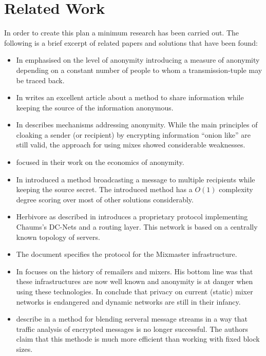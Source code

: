 \documentclass[twocolumn,a4paper,10pt,english]{scrartcl}
\begin{document}
\section{Related Work}
In order to create this plan a minimum research has been carried out. The following is a brief excerpt of related papers and solutions that have been found:
\begin{itemize}
\item In \cite{k-anonymous:ccs2003} \citeauthor{k-anonymous:ccs2003} emphasised on the level of anonymity introducing a measure of anonymity depending on a constant number of people to whom a transmission-tuple may be traced back.
\item In \citeyear{chaum-dc} \citeauthor{chaum-dc} writes an excellent article\cite{chaum-dc} about a method to share information while keeping the source of the information anonymous.
\item In \cite{CHAUM1} \citeauthor{CHAUM1} describes mechanisms addressing anonymity. While the main principles of cloaking a sender (or recipient) by encrypting information ``onion like'' are still valid, the approach for using mixes showed considerable weaknesses.
\item \citeauthor{danezis:weis2006} focused in their work \cite{danezis:weis2006} on the economics of anonymity.
\item In \cite{xor-trees} \citeauthor{xor-trees} introduced a method broadcasting a message to multiple recipients while keeping the source secret. The introduced method has a $O(1)$ complexity degree scoring over most of other solutions considerably.
\item Herbivore as described in \cite{herbivore:tr} introduces a proprietary protocol implementing Chaums's DC-Nets and a routing layer. This network is based on a centrally known topology of servers.
\item The document \cite{mixmaster-spec} specifies the protocol for the Mixmaster infrastructure.
\item In \cite{remailer-history} \citeauthor{remailer-history} focuses on the history of remailers and mixers. His bottom line was that these infrastructures are now well known and anonymity is at danger when using these technologies. In \cite{RP03-1} \citeauthor{RP03-1} conclude that privacy on current (static) mixer networks is endangered and dynamic networks are still in their infancy.
\item \citeauthor{morphmix:wpes2002} describe in \cite{morphmix:wpes2002} a method for blending serveral message streams in a way that traffic analysis of encrypted messages is no longer successful. The authors claim that this methode is much more efficient than working with fixed block sizes.

\end{itemize}
\end{document}
